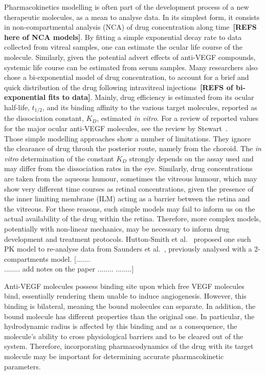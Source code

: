 \documentclass[11pt,a4paper]{article}
\begin{document}
Pharmacokinetics modelling is often part of the development process of a new therapeutic molecules, as a mean to analyse data.
In its simplest form, it consists in non-compartmental analysis (NCA) of drug concentration along time~\textbf{[REFS here of NCA models]}.
By fitting a simple exponential decay rate to data collected from vitreal samples, one can estimate the ocular life course of the molecule.
Similarly, given the potential advert effects of anti-VEGF compounds, systemic life course can be estimated from serum samples.
Many researchers also chose a bi-exponential model of drug concentration, to account for a brief and quick distribution of the drug following intravitreal injections~\textbf{[REFS of bi-exponential fits to data]}.
Mainly, drug efficiency is estimated from its ocular half-life, $t_{1/2}$, and its binding affinity to the various target molecules, reported as the dissociation constant, $K_D$, estimated \textit{in vitro}.
For a review of reported values for the major ocular anti-VEGF molecules, see the review by Stewart~\cite{stewart_pharmacokinetics_2014}.\\
Those simple modelling approaches show a number of limitations.
They ignore the clearance of drug throuh the posterior route, namely from the choroid.
The \textit{in vitro} determination of the constant $K_D$ strongly depends on the assay used and may differ from the dissociation rates in the eye.
Similarly, drug concentrations are taken from the aqueous humour, sometimes the vitreous humour, which may show very different time courses as retinal concentrations, given the presence of the inner limiting membrane (ILM) acting as a barrier between the retina and the vitreous.
For these reasons, such simple models may fail to inform us on the actual availability of the drug within the retina.
Therefore, more complex models, potentially with non-linear mechanics, may be necessary to inform drug development and treatment protocols.
Hutton-Smith et al.~\cite{hutton-smith_ocular_2017} proposed one such PK model to re-analyse data from Saunders et al.~\cite{saunders_model_2015}, previously analysed with a 2-compartments model.
[.......\\
........
add notes on the paper
........
........]

Anti-VEGF molecules possess binding site upon which free VEGF molecules bind, essentially rendering them unable to induce angiogenesis.
However, this binding is bilateral, meaning the bound molecules can separate.
In addition, the bound molecule has different properties than the original one.
In particular, the hydrodynamic radius is affected by this binding and as a consequence, the molecule's ability to cross physiological barriers and to be cleared out of the system.
Therefore, incorporating pharmacodynamics of the drug with its target molecule may be important for determining accurate pharmacokinetic parameters.
\end{document}
